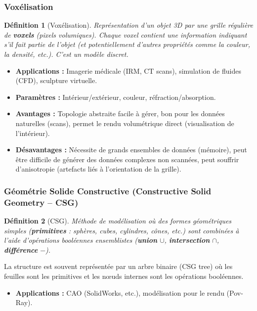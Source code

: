 \documentclass{article}
\newtheorem{definition}{Définition}
\begin{document}
\subsubsection{Voxélisation}
\begin{definition}[Voxélisation]
Représentation d'un objet 3D par une grille régulière de \textbf{voxels} (pixels volumiques). Chaque voxel contient une information indiquant s'il fait partie de l'objet (et potentiellement d'autres propriétés comme la couleur, la densité, etc.). C'est un modèle discret.
\end{definition}
\begin{itemize}
    \item \textbf{Applications :} Imagerie médicale (IRM, CT scans), simulation de fluides (CFD), sculpture virtuelle.
    \item \textbf{Paramètres :} Intérieur/extérieur, couleur, réfraction/absorption.
    \item \textbf{Avantages :} Topologie abstraite facile à gérer, bon pour les données naturelles (scans), permet le rendu volumétrique direct (visualisation de l'intérieur).
    \item \textbf{Désavantages :} Nécessite de grands ensembles de données (mémoire), peut être difficile de générer des données complexes non scannées, peut souffrir d'anisotropie (artefacts liés à l'orientation de la grille).
\end{itemize}

\subsubsection{Géométrie Solide Constructive (Constructive Solid Geometry – CSG)}
\begin{definition}[CSG]
Méthode de modélisation où des formes géométriques simples (\textbf{primitives} : sphères, cubes, cylindres, cônes, etc.) sont combinées à l'aide d'opérations booléennes ensemblistes (\textbf{union} $\cup$, \textbf{intersection} $\cap$, \textbf{différence} $-$).
\end{definition}
La structure est souvent représentée par un arbre binaire (CSG tree) où les feuilles sont les primitives et les nœuds internes sont les opérations booléennes.

\begin{itemize}
    \item \textbf{Applications :} CAO (SolidWorks, etc.), modélisation pour le rendu (Pov-Ray).
\end{itemize}
\end{document}
